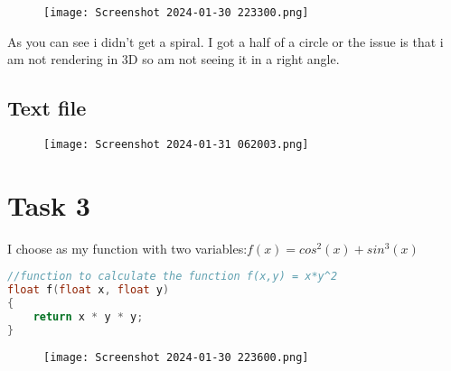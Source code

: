 \documentclass[12pt]{article}
\begin{document}
\begin{figure}[htp]
\centering
\texttt{[image: Screenshot 2024-01-30 223300.png]}
\caption{\label{fig:Spiral}  }
\end{figure}
As you can see i didn't get a spiral. I got a half of a circle or the issue is that i am not rendering in 3D so am not seeing it in a right angle.

\newpage
\subsection{Text file}
\begin{figure}[htp]
\centering
\texttt{[image: Screenshot 2024-01-31 062003.png]}
\caption{\label{fig:Spiral_data}  }
\end{figure}

\newpage
\section{Task 3}
I choose as my function with two variables:\( f(x)=cos^2(x)+sin^3(x) \)

\begin{lstlisting}[language=C++, caption={Function with two variables}]
//function to calculate the function f(x,y) = x*y^2
float f(float x, float y) 
{
    return x * y * y;
}
\end{lstlisting}

\begin{figure}[htp]
\centering
\texttt{[image: Screenshot 2024-01-30 223600.png]}
\caption{\label{fig:text file}  }
\end{figure}
\end{document}
